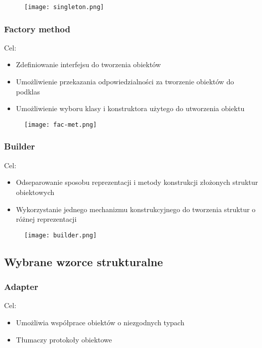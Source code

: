 \documentclass[a4paper]{article}
\begin{document}
    \begin{figure}[H]
        \texttt{[image: singleton.png]}
    \end{figure}

    \subsubsection{Factory method}
    Cel:
    \begin{itemize}
        \item Zdefiniowanie interfejsu do tworzenia obiektów
        \item Umożliwienie przekazania odpowiedzialności za tworzenie obiektów
        do podklas
        \item Umożliwienie wyboru klasy i konstruktora użytego do utworzenia
        obiektu
    \end{itemize}

    \begin{figure}[H]
        \texttt{[image: fac-met.png]}
    \end{figure}


    \subsubsection{Builder}
    Cel:
    \begin{itemize}
        \item Odseparowanie sposobu reprezentacji i metody konstrukcji
        złożonych struktur obiektowych
        \item Wykorzystanie jednego mechanizmu konstrukcyjnego do tworzenia
        struktur o różnej reprezentacji
    \end{itemize}


    \begin{figure}[H]
        \texttt{[image: builder.png]}
    \end{figure}



    \subsection{Wybrane wzorce strukturalne}

    \subsubsection{Adapter}
    Cel:
    \begin{itemize}
        \item Umożliwia współprace obiektów o niezgodnych typach
        \item Tłumaczy protokoły obiektowe
    \end{itemize}
\end{document}
